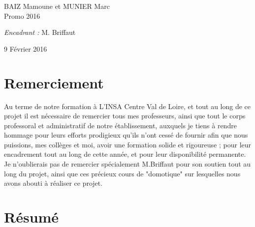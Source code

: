 {\begin{titlepage}
\begin{sffamily}
\begin{center}
    \begin{minipage}{0.4\textwidth}
      \begin{flushleft} \large
        BAIZ Mamoune et MUNIER Marc \\
        Promo 2016\\
      \end{flushleft}
    \end{minipage}
    \begin{minipage}{0.4\textwidth}
      \begin{flushright} \large
        \emph{Encadrant :} M. Briffaut\\
      \end{flushright}
    \end{minipage}

    \vfill

    {\large 9 Février 2016}

  \end{center}
  \end{sffamily}
\end{titlepage}
}
\newpage



\newpage
\section*{Remerciement}
Au terme de notre formation à L’INSA Centre Val de Loire, et tout au long de ce projet il est nécessaire de remercier tous mes professeurs, ainsi que tout le corps professoral et administratif de notre établissement, auxquels je tiens à rendre hommage pour leurs efforts prodigieux qu’ils n’ont cessé de fournir afin que nous puissions, mes collèges et moi, avoir une formation solide et rigoureuse ; pour leur encadrement tout au long de cette année, et pour leur disponibilité permanente. Je n’oublierais pas de remercier spécialement M.Briffaut pour son soutien tout au long du projet, ainsi que ces précieux cours de "domotique" sur lesquelles nous avons abouti à réaliser ce projet.\newline

\clearpage
\section*{Résumé}


